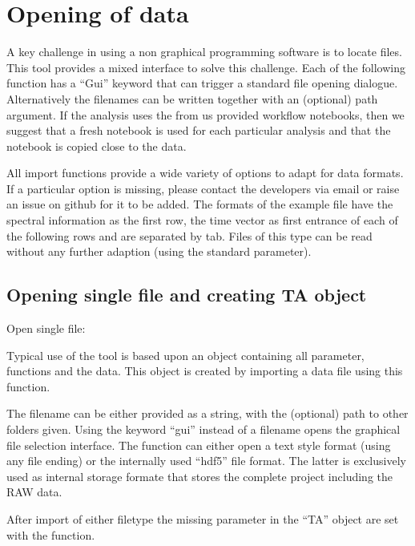 \documentclass[letterpaper,10pt,english]{sphinxmanual}
\begin{document}
\chapter{Opening of data}
\label{\detokenize{Opening:opening-of-data}}\label{\detokenize{Opening::doc}}
A key challenge in using a non graphical programming software is to locate files.
This tool provides a mixed interface to solve this challenge.
Each of the following function has a “Gui” keyword that can trigger a standard file
opening dialogue. Alternatively the filenames can be written together with an (optional)
path argument.
If the analysis uses the from us provided workflow notebooks, then we suggest that a fresh notebook
is used for each particular analysis and that the notebook is copied close to the data.

All import functions provide a wide variety of options to adapt for data formats. If a particular option is missing,
please contact the developers via email or raise an issue on github for it to be added.
The formats of the example file have the spectral information as the first row,
the time vector as first entrance of each of the following rows and are separated by tab.
Files of this type can be read without any further adaption (using the standard parameter).


\section{Opening single file and creating TA object}
\label{\detokenize{Opening:opening-single-file-and-creating-ta-object}}
Open single file:                       {\hyperref[\detokenize{plot_func:plot_func.TA.__init__}]{}}

Typical use of the tool is based upon an object containing all
parameter, functions and the data. This object is created by importing a
data file using this function.

The filename can be either provided as a string, with the (optional) path to other folders given.
Using the keyword “gui” instead of a filename opens the graphical file selection interface.
The function can either open a text style format (using any file ending) or the internally used “hdf5” file format.
The latter is exclusively used as internal storage formate that stores the complete project including the RAW data.

After import of either filetype the missing parameter in the “TA” object are set with the
{\hyperref[\detokenize{plot_func:plot_func.TA.__make_standard_parameter}]{}} function.
\end{document}
